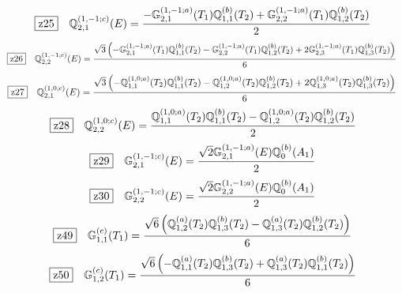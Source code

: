 \documentclass[fleqn,10pt,landscape]{jsarticle}
\begin{document}
\begin{dmath*}
\hspace*{3mm}\fbox{z25}\quad \mathbb{Q}_{2,1}^{(1,-1;c)}(E)=\frac{- \mathbb{G}_{2,1}^{(1,-1;a)}(T_{1}) \mathbb{Q}_{1,1}^{(b)}(T_{2}) + \mathbb{G}_{2,2}^{(1,-1;a)}(T_{1}) \mathbb{Q}_{1,2}^{(b)}(T_{2})}{2}
\end{dmath*}
\begin{dmath*}
\hspace*{3mm}\fbox{z26}\quad \mathbb{Q}_{2,2}^{(1,-1;c)}(E)=\frac{\sqrt{3} \left(- \mathbb{G}_{2,1}^{(1,-1;a)}(T_{1}) \mathbb{Q}_{1,1}^{(b)}(T_{2}) - \mathbb{G}_{2,2}^{(1,-1;a)}(T_{1}) \mathbb{Q}_{1,2}^{(b)}(T_{2}) + 2 \mathbb{G}_{2,3}^{(1,-1;a)}(T_{1}) \mathbb{Q}_{1,3}^{(b)}(T_{2})\right)}{6}
\end{dmath*}
\begin{dmath*}
\hspace*{3mm}\fbox{z27}\quad \mathbb{Q}_{2,1}^{(1,0;c)}(E)=\frac{\sqrt{3} \left(- \mathbb{Q}_{1,1}^{(1,0;a)}(T_{2}) \mathbb{Q}_{1,1}^{(b)}(T_{2}) - \mathbb{Q}_{1,2}^{(1,0;a)}(T_{2}) \mathbb{Q}_{1,2}^{(b)}(T_{2}) + 2 \mathbb{Q}_{1,3}^{(1,0;a)}(T_{2}) \mathbb{Q}_{1,3}^{(b)}(T_{2})\right)}{6}
\end{dmath*}
\begin{dmath*}
\hspace*{3mm}\fbox{z28}\quad \mathbb{Q}_{2,2}^{(1,0;c)}(E)=\frac{\mathbb{Q}_{1,1}^{(1,0;a)}(T_{2}) \mathbb{Q}_{1,1}^{(b)}(T_{2}) - \mathbb{Q}_{1,2}^{(1,0;a)}(T_{2}) \mathbb{Q}_{1,2}^{(b)}(T_{2})}{2}
\end{dmath*}
\begin{dmath*}
\hspace*{3mm}\fbox{z29}\quad \mathbb{G}_{2,1}^{(1,-1;c)}(E)=\frac{\sqrt{2} \mathbb{G}_{2,1}^{(1,-1;a)}(E) \mathbb{Q}_{0}^{(b)}(A_{1})}{2}
\end{dmath*}
\begin{dmath*}
\hspace*{3mm}\fbox{z30}\quad \mathbb{G}_{2,2}^{(1,-1;c)}(E)=\frac{\sqrt{2} \mathbb{G}_{2,2}^{(1,-1;a)}(E) \mathbb{Q}_{0}^{(b)}(A_{1})}{2}
\end{dmath*}
\begin{dmath*}
\hspace*{3mm}\fbox{z49}\quad \mathbb{G}_{1,1}^{(c)}(T_{1})=\frac{\sqrt{6} \left(\mathbb{Q}_{1,2}^{(a)}(T_{2}) \mathbb{Q}_{1,3}^{(b)}(T_{2}) - \mathbb{Q}_{1,3}^{(a)}(T_{2}) \mathbb{Q}_{1,2}^{(b)}(T_{2})\right)}{6}
\end{dmath*}
\begin{dmath*}
\hspace*{3mm}\fbox{z50}\quad \mathbb{G}_{1,2}^{(c)}(T_{1})=\frac{\sqrt{6} \left(- \mathbb{Q}_{1,1}^{(a)}(T_{2}) \mathbb{Q}_{1,3}^{(b)}(T_{2}) + \mathbb{Q}_{1,3}^{(a)}(T_{2}) \mathbb{Q}_{1,1}^{(b)}(T_{2})\right)}{6}
\end{dmath*}
\end{document}
